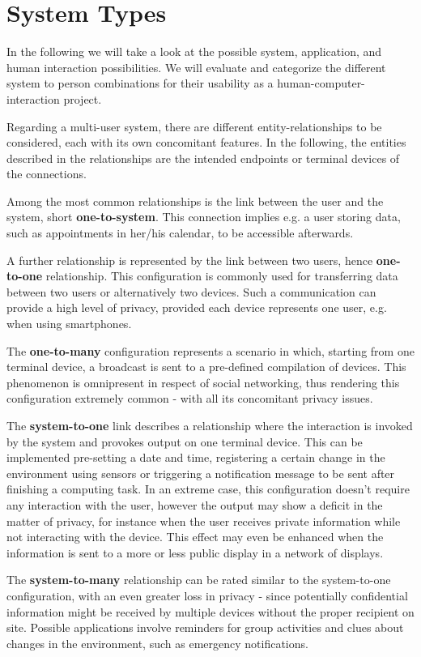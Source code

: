 \documentclass{acm_proc_article-sp}
\begin{document}
\section{System Types}

In the following we will take a look at the possible system, application, and human interaction possibilities.
We will evaluate and categorize the different system to person combinations for their usability as a human-computer-interaction project.

Regarding a multi-user system, there are different entity-relationships to be considered, each with its own concomitant features.
In the following, the entities described in the relationships are the intended endpoints or terminal devices of the connections.

Among the most common relationships is the link between the user and the system, short \textbf{one-to-system}.
This connection implies e.g. a user storing data, such as appointments in her/his calendar, to be accessible afterwards.

A further relationship is represented by the link between two users, hence \textbf{one-to-one }relationship.
This configuration is commonly used for transferring data between two users or alternatively two devices.
Such a communication can provide a high level of privacy, provided each device represents one user, e.g. when using smartphones.

The \textbf{one-to-many} configuration represents a scenario in which, starting from one terminal device, a broadcast is sent to a pre-defined compilation of devices.
This phenomenon is omnipresent in respect of social networking, thus rendering this configuration extremely common - with all its concomitant privacy issues.

The \textbf{system-to-one} link describes a relationship where the interaction is invoked by the system and provokes output on one terminal device.
This can be implemented pre-setting a date and time, registering a certain change in the environment using sensors or triggering a notification message to be sent after finishing a computing task.
In an extreme case, this configuration doesn’t require any interaction with the user, however the output may show a deficit in the matter of privacy, for instance when the user receives private information while not interacting with the device.
This effect may even be enhanced when the information is sent to a more or less public display in a network of displays.

The \textbf{system-to-many} relationship can be rated similar to the system-to-one configuration, with an even greater loss in privacy - since potentially confidential information might be received by multiple devices without the proper recipient on site.
Possible applications involve reminders for group activities and clues about changes in the environment, such as emergency notifications.
\end{document}
